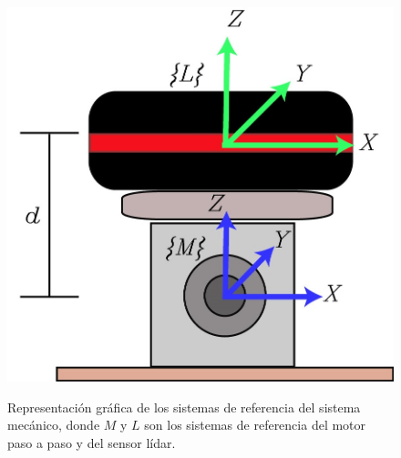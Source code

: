 \begin{figure}[ht!]
\centering \footnotesize
 {\includegraphics[width=0.55\linewidth]{images/lidar_kbki.jpg}}
 \captionsetup{font=footnotesize}
 \caption{Representación gráfica de los sistemas de referencia del sistema 
 mecánico, donde $M$ y $L$ son los sistemas de referencia del motor paso a 
 paso y del sensor lídar.}
\label{f:FrameSitemaMecanico}
\end{figure}

